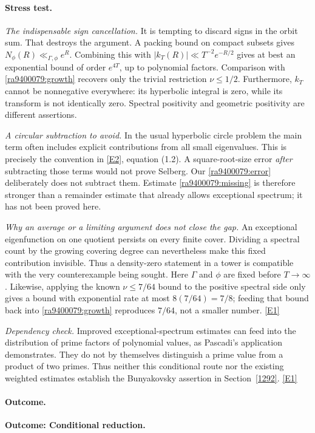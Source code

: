 \documentclass[11pt]{article}
\newcommand{\eref}[2]{\hyperlink{extra:#1:#2}{[E#2]}}
\begin{document}
\paragraph{Stress test.}
\emph{The indispensable sign cancellation.}
It is tempting to discard signs in the orbit sum. That destroys the argument.
A packing bound on compact subsets gives $N_\phi(R)\ll_{\Gamma,\phi}e^R$.
Combining this with $|k_T(R)|\ll T^{-2}e^{-R/2}$ gives at best an exponential
bound of order $e^{4T}$, up to polynomial factors. Comparison with
\eqref{ra9400079:growth} recovers only the trivial restriction $\nu\le1/2$.
Furthermore, $k_T$ cannot be nonnegative everywhere: its hyperbolic integral
is zero, while its transform is not identically zero. Spectral positivity
and geometric positivity are different assertions.

\emph{A circular subtraction to avoid.}
In the usual hyperbolic circle problem the main term often includes explicit
contributions from all small eigenvalues. This is precisely the convention
in \eref{9400079}{2}, equation (1.2). A square-root-size error \emph{after}
subtracting those terms would not prove Selberg. Our
\eqref{ra9400079:error} deliberately does not subtract them. Estimate
\eqref{ra9400079:missing} is therefore stronger than a remainder estimate that
already allows exceptional spectrum; it has not been proved here.

\emph{Why an average or a limiting argument does not close the gap.}
An exceptional eigenfunction on one quotient persists on every finite cover.
Dividing a spectral count by the growing covering degree can nevertheless
make this fixed contribution invisible. Thus a density-zero statement in a
tower is compatible with the very counterexample being sought. Here $\Gamma$
and $\phi$ are fixed before $T\to\infty$. Likewise, applying the known
$\nu\le7/64$ bound to the positive spectral side only gives a bound with
exponential rate at most $8(7/64)=7/8$; feeding that bound back into
\eqref{ra9400079:growth} reproduces $7/64$, not a smaller number.
\eref{9400079}{1}

\emph{Dependency check.}
Improved exceptional-spectrum estimates can feed into the distribution of
prime factors of polynomial values, as Pascadi's application demonstrates.
They do not by themselves distinguish a prime value from a product of two
primes. Thus neither this conditional route nor the existing weighted
estimates establish the Bunyakovsky assertion in Section~\ref{1292}.
\eref{9400079}{1}

\paragraph{Outcome.}
\textbf{Outcome: Conditional reduction.}
\end{document}
